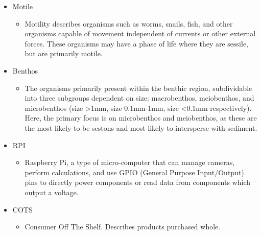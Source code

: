 \documentclass[fleqn,10pt]{SelfArx} %
\begin{document}
\begin{itemize}
\begin{itemize}
		\end{itemize}
		
		\item Motile
		\begin{itemize}
			\item Motility describes organisms such as worms, snails, fish, and other organisms capable of movement independent of currents or other external forces. These organisms may have a phase of life where they are sessile, but are primarily motile.
			
		\end{itemize}
		
		\item Benthos 
		\begin{itemize}
			\item The organisms primarily present within the benthic region, subdividable into three subgroups dependent on size: macrobenthos, meiobenthos, and microbenthos (size >1mm, size 0.1mm-1mm, size <0.1mm respectively). Here, the primary focus is on microbenthos and meiobenthos, as these are the most likely to be sestons and most likely to intersperse with sediment. 
			
		\end{itemize}
		
		\item RPI 
		\begin{itemize}
			\item Raspberry Pi, a type of micro-computer that can manage cameras, perform calculations, and use GPIO (General Purpose Input/Output) pins to directly power components or read data from components which output a voltage.
			
		\end{itemize}
		
		\item COTS 
		\begin{itemize}
			\item Consumer Off The Shelf. Describes products purchased whole.
			
		\end{itemize}
	\end{itemize}
	
	
\end{document}
